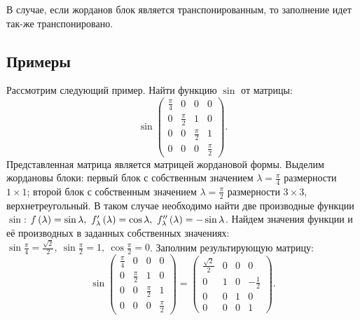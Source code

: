 \begin{enumerate}
		В случае, если жорданов блок является транспонированным, то заполнение идет так-же транспонировано.

	\end{enumerate}

	\subsection{Примеры}

		Рассмотрим следующий пример. Найти функцию $\sin$ от матрицы:
		\[ \sin\begin{pmatrix} \frac{\pi}{4} & 0 & 0 & 0 \\ 0 & \frac{\pi}{2} & 1 & 0 \\ 0 & 0 & \frac{\pi}{2} & 1 \\ 0 & 0 & 0 & \frac{\pi}{2} \end{pmatrix}. \]
		Представленная матрица является матрицей жордановой формы. Выделим жордановы блоки: первый блок с собственным значением $\lambda = \frac{\pi}{4}$ размерности $1 \times 1$; второй блок с собственным значением $\lambda = \frac{\pi}{2}$ размерности $3 \times 3$, верхнетреугольный. В таком случае необходимо найти две производные функции $\sin$: $f\left( \lambda \right) = \sin{\lambda}, ~ f'_{\lambda} \left( \lambda \right) = \cos{\lambda}, ~ f''_{\lambda} \left( \lambda \right) = - \sin{\lambda}$. Найдем значения функции и её производных в заданных собственных значениях: $\sin{\frac{\pi}{4}} = \frac{\sqrt{2}}{2}, ~ \sin{\frac{\pi}{2}} = 1, ~ \cos{\frac{\pi}{2}} = 0$. Заполним результирующую матрицу:
		\[ \sin\begin{pmatrix} \frac{\pi}{4} & 0 & 0 & 0 \\ 0 & \frac{\pi}{2} & 1 & 0 \\ 0 & 0 & \frac{\pi}{2} & 1 \\ 0 & 0 & 0 & \frac{\pi}{2} \end{pmatrix} = \begin{pmatrix} \frac{\sqrt{2}}{2} & 0 & 0 & 0 \\ 0 & 1 & 0 & -\frac{1}{2} \\ 0 & 0 & 1 & 0 \\ 0 & 0 & 0 & 1 \end{pmatrix}. \]

